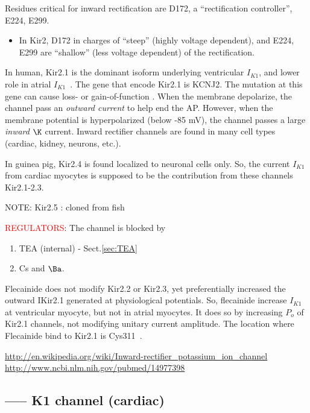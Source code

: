 Residues critical for inward rectification are D172, a ``rectification
controller'', E224, E299.
\begin{itemize}
\item In Kir2, D172 in charges of ``steep'' (highly voltage
  dependent), and E224, E299 are ``shallow'' (less voltage dependent)
  of the rectification. 
\end{itemize}

In human, Kir2.1 is the dominant isoform underlying ventricular $I_{K1}$, and
lower role in atrial $I_{K1}$~\citep{Gaborit2007}. The gene that encode Kir2.1
is KCNJ2. The mutation at this gene can cause loss- or gain-of-function
\citep{lopatin2001}. When the membrane depolarize, the channel pass an {\it
outward current} to help end the AP. However, when the membrane potential is
hyperpolarized (below -85 mV), the channel passes a large {\it inward} $\K$
current. Inward rectifier channels are found in many cell types (cardiac,
kidney, neurons, etc.).

In guinea pig, Kir2.4 is found localized to neuronal cells only. So, the current
$I_{K1}$ from cardiac myocytes is supposed to be the contribution from these
channels Kir2.1-2.3.
    
NOTE: Kir2.5 : cloned from fish


\textcolor{red}{REGULATORS}: The channel is blocked by
\begin{enumerate}
  \item TEA (internal) - Sect.\ref{sec:TEA}
  \item Cs and $\Ba$.
\end{enumerate}


Flecainide does not modify Kir2.2 or Kir2.3, yet preferentially
increased the outward IKir2.1 generated at physiological potentials.
So, flecainide increase $I_{K1}$ at ventricular myocyte, but not in
atrial myocytes. It does so by increasing $P_o$ of Kir2.1 channels,
not modifying unitary current amplitude. The location where Flecainide
bind to Kir2.1 is Cys311~\citep{Caballero2010}.


\url{http://en.wikipedia.org/wiki/Inward-rectifier_potassium_ion_channel}
\url{http://www.ncbi.nlm.nih.gov/pubmed/14977398}

\subsection{----- K1 channel (cardiac)}
\label{sec:IK1_current}

